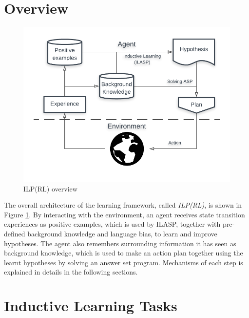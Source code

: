 \section{Overview}
\label{sec:overview}

\begin{figure}[!htb]
\centering
\includegraphics[width=1.0\textwidth]{./figures/architecture}
\caption{ILP(RL) overview}
\label{fig:ILPRL_overview}
\end{figure}

The overall architecture of the learning framework, called \textit{ILP(RL)}, is shown in Figure \ref{fig:ILPRL_overview}. 
By interacting with the environment, an agent receives state transition experiences as positive examples, which is used by ILASP, together with pre-defined background knowledge and language bias, to learn and improve hypotheses.
The agent also remembers surrounding information it has seen as background knowledge, which is used to make an action plan together using the learnt hypotheses by solving an answer set program.
Mechanisms of each step is explained in details in the following sections.

\section{Inductive Learning Tasks}
\label{sec:inductive_learning_tasks}


